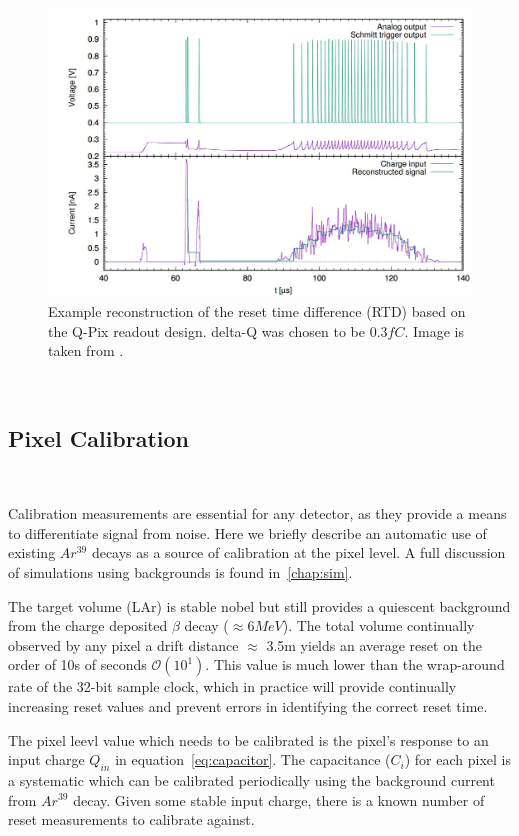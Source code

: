 \begin{figure}[]
\centering
\includegraphics[width=\textwidth]{images/qpix_rtd_reconstruction_example_03fc.jpg}
\caption{Example reconstruction of the reset time difference (RTD) based on the Q-Pix readout design. delta-Q was chosen to be $0.3 fC$. Image is taken from \citep{qpix:nygren:mei}.}
\end{figure}
~\label{fig:qpixRecon2}

\subsection{Pixel Calibration}
~\label{sec:background}

Calibration measurements are essential for any detector, as they provide a means to differentiate signal from noise.
Here we briefly describe an automatic use of existing $Ar^{39}$ decays as a source of calibration at the pixel level.
A full discussion of simulations using backgrounds is found in~\ref{chap:sim}.

The target volume (LAr) is stable nobel but still provides a quiescent background from the charge deposited $\beta$ decay ($\approx 6\unit{MeV}$).
The total volume continually observed by any pixel a drift distance $\approx$ 3.5\unit{m} yields an average reset on the order of 10s of seconds $\mathcal{O}(10^{1})$.
This value is much lower than the wrap-around rate of the 32-bit sample clock, which in practice will provide continually increasing reset values and prevent errors in identifying the correct reset time.

The pixel leevl value which needs to be calibrated is the pixel's response to an input charge $Q_{in}$ in equation~\ref{eq:capacitor}.
The capacitance ($C_{i}$) for each pixel is a systematic which can be calibrated periodically using the background current from $Ar^{39}$ decay.
Given some stable input charge, there is a known number of reset measurements to calibrate against.

